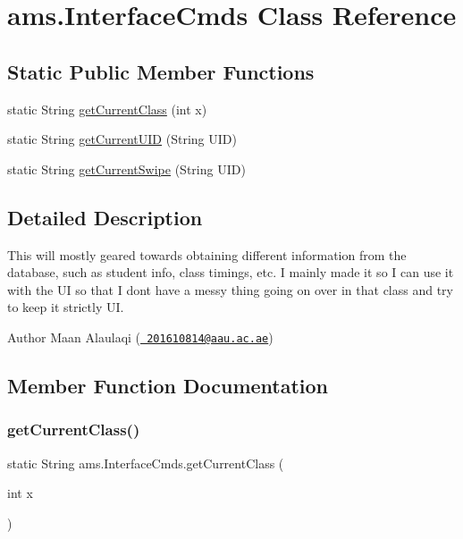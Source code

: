 \hypertarget{classams_1_1_interface_cmds}{}\section{ams.\+Interface\+Cmds Class Reference}
\label{classams_1_1_interface_cmds}
\subsection*{Static Public Member Functions}
\begin{DoxyCompactItemize}
\item 
static String \mbox{\hyperlink{classams_1_1_interface_cmds_a058a0bca2695aca4f396daddaf009686}{get\+Current\+Class}} (int x)
\item 
static String \mbox{\hyperlink{classams_1_1_interface_cmds_a130756a981203cad81e5d92a8bfaf1f0}{get\+Current\+U\+ID}} (String U\+ID)
\item 
static String \mbox{\hyperlink{classams_1_1_interface_cmds_aaae6e75ca4f733d4af6b2eb27844d730}{get\+Current\+Swipe}} (String U\+ID)
\end{DoxyCompactItemize}


\subsection{Detailed Description}
This will mostly geared towards obtaining different information from the database, such as student info, class timings, etc. I mainly made it so I can use it with the UI so that I don\textquotesingle{}t have a messy thing going on over in that class and try to keep it strictly UI.

\begin{DoxyAuthor}{Author}
Maan Alaulaqi (\href{mailto:201610814@aau.ac.ae}{\texttt{ 201610814@aau.\+ac.\+ae}}) 
\end{DoxyAuthor}


\subsection{Member Function Documentation}
\mbox{\label{classams_1_1_interface_cmds_a058a0bca2695aca4f396daddaf009686}} 
\subsubsection{\texorpdfstring{getCurrentClass()}{getCurrentClass()}}
{\footnotesize\ttfamily static String ams.\+Interface\+Cmds.\+get\+Current\+Class (\begin{DoxyParamCaption}\item[{int}]{x }\end{DoxyParamCaption})\hspace{0.3cm}{\ttfamily [static]}}

